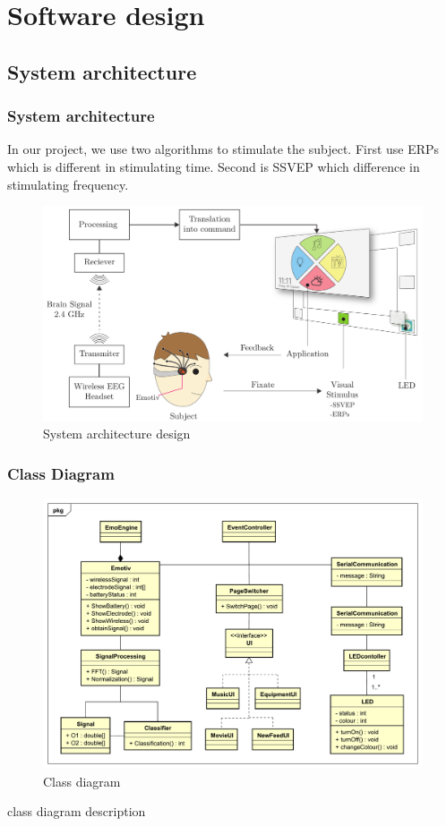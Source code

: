 \chapter{Software design}

\label{ch:Software design}

\setlength{\parindent}{4em}
\setlength{\parskip}{1em}
\renewcommand{\baselinestretch}{1.5}

\section{System architecture}

\subsection{System architecture}
\hspace{1.5cm}In our project, we use two algorithms to stimulate the subject. First use ERPs which is different in stimulating time. Second is SSVEP which difference in stimulating frequency.

\begin{figure}[h]
	\centering
	\includegraphics[scale = 0.3]{chapter5/architec.pdf}
	\caption{System architecture design}
\end{figure}

\subsection{Class Diagram}

\begin{figure}[h]
	\centering
	\includegraphics[scale = 0.5]{chapter5/Class.pdf}
	\caption{Class diagram}
\end{figure}

class diagram description